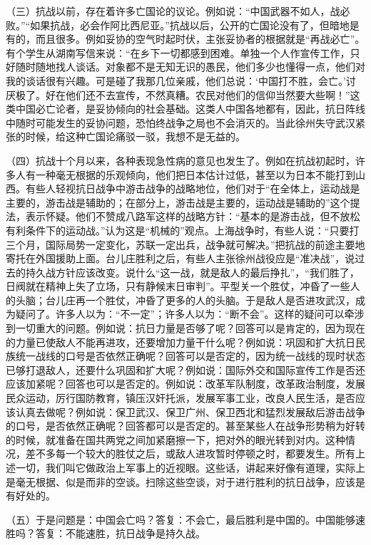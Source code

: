 （三）抗战以前，存在着许多亡国论的议论。例如说：“中国武器不如人，战必败。”“如果抗战，必会作阿比西尼亚。”抗战以后，公开的亡国论没有了，但暗地是有的，而且很多。例如妥协的空气时起时伏，主张妥协者的根据就是“再战必亡”。有个学生从湖南写信来说：“在乡下一切都感到困难。单独一个人作宣传工作，只好随时随地找人谈话。对象都不是无知无识的愚民，他们多少也懂得一点，他们对我的谈话很有兴趣。可是碰了我那几位亲戚，他们总说：‘中国打不胜，会亡。’讨厌极了。好在他们还不去宣传，不然真糟。农民对他们的信仰当然要大些啊！”这类中国必亡论者，是妥协倾向的社会基础。这类人中国各地都有，因此，抗日阵线中随时可能发生的妥协问题，恐怕终战争之局也不会消灭的。当此徐州失守武汉紧张的时候，给这种亡国论痛驳一驳，我想不是无益的。

（四）抗战十个月以来，各种表现急性病的意见也发生了。例如在抗战初起时，许多人有一种毫无根据的乐观倾向，他们把日本估计过低，甚至以为日本不能打到山西。有些人轻视抗日战争中游击战争的战略地位，他们对于“在全体上，运动战是主要的，游击战是辅助的；在部分上，游击战是主要的，运动战是辅助的”这个提法，表示怀疑。他们不赞成八路军这样的战略方针：“基本的是游击战，但不放松有利条件下的运动战。”认为这是“机械的”观点。上海战争时，有些人说：“只要打三个月，国际局势一定变化，苏联一定出兵，战争就可解决。”把抗战的前途主要地寄托在外国援助上面。台儿庄胜利之后，有些人主张徐州战役应是“准决战”，说过去的持久战方针应该改变。说什么“这一战，就是敌人的最后挣扎”，“我们胜了，日阀就在精神上失了立场，只有静候末日审判”。平型关一个胜仗，冲昏了一些人的头脑；台儿庄再一个胜仗，冲昏了更多的人的头脑。于是敌人是否进攻武汉，成为疑问了。许多人以为：“不一定”；许多人以为：“断不会”。这样的疑问可以牵涉到一切重大的问题。例如说：抗日力量是否够了呢？回答可以是肯定的，因为现在的力量已使敌人不能再进攻，还要增加力量干什么呢？例如说：巩固和扩大抗日民族统一战线的口号是否依然正确呢？回答可以是否定的，因为统一战线的现时状态已够打退敌人，还要什么巩固和扩大呢？例如说：国际外交和国际宣传工作是否还应该加紧呢？回答也可以是否定的。例如说：改革军队制度，改革政治制度，发展民众运动，厉行国防教育，镇压汉奸托派，发展军事工业，改良人民生活，是否应该认真去做呢？例如说：保卫武汉、保卫广州、保卫西北和猛烈发展敌后游击战争的口号，是否依然正确呢？回答都可以是否定的。甚至某些人在战争形势稍为好转的时候，就准备在国共两党之间加紧磨擦一下，把对外的眼光转到对内。这种情况，差不多每一个较大的胜仗之后，或敌人进攻暂时停顿之时，都要发生。所有上述一切，我们叫它做政治上军事上的近视眼。这些话，讲起来好像有道理，实际上是毫无根据、似是而非的空谈。扫除这些空谈，对于进行胜利的抗日战争，应该是有好处的。

（五）于是问题是：中国会亡吗？答复：不会亡，最后胜利是中国的。中国能够速胜吗？答复：不能速胜，抗日战争是持久战。

